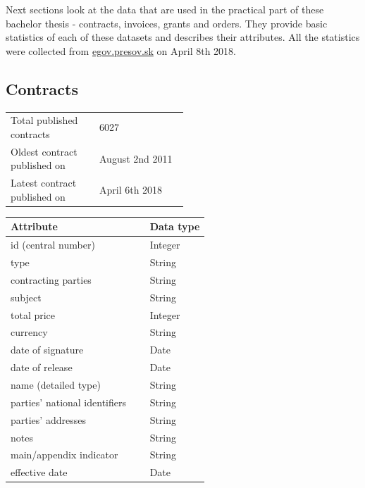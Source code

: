 \documentclass[thesis=B,english]{sprlajur-slovakopendata}[2018/05/12]
\begin{document}
Next sections look at the data that are used in the practical part of these bachelor thesis - contracts, invoices, grants and orders. They provide basic statistics of each of these datasets and describes their attributes. All the statistics were collected from \url{egov.presov.sk} on April 8th 2018.
\subsection{Contracts}
\begin{tabular}{  p{0.5\linewidth}  l }
	\\
	Total published contracts    & 6027            \\
	Oldest contract published on & August 2nd 2011 \\
	Latest contract published on & April 6th 2018  \\
\end{tabular}
        
\begin{center}
	\begin{tabular}{  p{0.7\linewidth} | p{0.3\linewidth} }
		Attribute                     & Data type \\ \hline
		id (central number)           & Integer   \\
		type                          & String    \\
		contracting parties           & String    \\
		subject                       & String    \\
		total price                   & Integer   \\
		currency                      & String    \\
		date of signature             & Date      \\
		date of release               & Date      \\
		name (detailed type)          & String    \\
		parties' national identifiers & String    \\
		parties' addresses            & String    \\
		notes                         & String    \\
		main/appendix indicator       & String    \\
		effective date                & Date      \\
	\end{tabular}
\end{center}
\newpage
\end{document}
